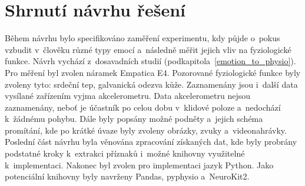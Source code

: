     \vspace{6mm}
    
    \section{Shrnutí návrhu řešení}
    Během návrhu bylo specifikováno zaměření experimentu, kdy půjde o~pokus vzbudit v~člověku různé typy emocí a~následně měřit jejich vliv na fyziologické funkce. Návrh vychází z~dosavadních studií (podkapitola~\ref{emotion_to_physio}). Pro měření byl zvolen náramek Empatica E4. Pozorované fyziologické funkce byly zvoleny tyto: srdeční tep, galvanická odezva kůže. Zaznamenány jsou i~další data vysílané zařízením vyjma akcelerometru. Data akcelerometru nejsou zaznamenány, neboť je účastník po celou dobu v~klidové poloze a~nedochází k~žádnému pohybu.  Dále byly popsány možné podněty a~jejich schéma promítání, kde po krátké úvaze byly zvoleny obrázky, zvuky a~videonahrávky. Poslední část návrhu byla věnována zpracování získaných dat, kde byly probrány podstatné kroky k~extrakci příznaků i~možné knihovny využitelné k~implementaci. Nakonec byl zvolen pro implementaci jazyk Python. Jako potenciální knihovny byly navrženy Pandas, pyphysio a~NeuroKit2.
